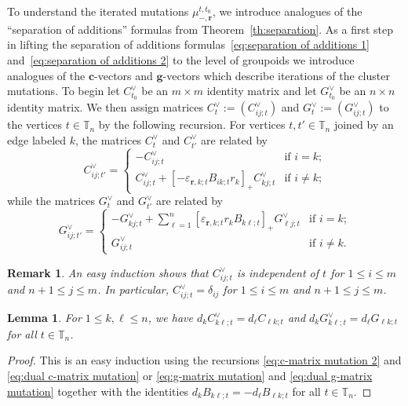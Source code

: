 \documentclass{amsart}
\newtheorem{lemma}[theorem]{Lemma}
\newtheorem{remark}[theorem]{Remark}
\numberwithin{equation}{section}
\newcommand{\bfc}{\mathbf{c}}
\newcommand{\bfg}{\mathbf{g}}
\newcommand{\bfr}{{\boldsymbol{r}}}
\newcommand{\TT}{\mathbb{T}}
\begin{document}
To understand the iterated mutations $\mu_{-,\bfr}^{t,t_0}$, we introduce analogues of the ``separation of additions'' formulas from Theorem~\ref{th:separation}.
As a first step in lifting the separation of additions formulas~\eqref{eq:separation of additions 1} and~\eqref{eq:separation of additions 2} to the level of groupoids we introduce analogues of the $\bfc$-vectors and $\bfg$-vectors which describe iterations of the cluster mutations.
To begin let $C^\vee_{t_0}$ be an $m\times m$ identity matrix and let $G^\vee_{t_0}$ be an $n\times n$ identity matrix.
We then assign matrices $C^\vee_t:=(C^\vee_{ij;t})$ and $G^\vee_t:=(G^\vee_{ij;t})$ to the vertices $t\in\TT_n$ by the following recursion.
For vertices $t,t'\in\TT_n$ joined by an edge labeled $k$, the matrices $C^\vee_t$ and $C^\vee_{t'}$ are related by
\begin{equation}
  \label{eq:dual c-matrix mutation}
  C^\vee_{ij;t'}=
  \begin{cases}
    -C^\vee_{ij;t} & \text{if $i=k$;}\\
    C^\vee_{ij;t}+[-\varepsilon_{\bfr,k;t} B_{ik;t} r_k]_+ C^\vee_{kj;t} & \text{if $i\ne k$;}
  \end{cases}
\end{equation}
while the matrices $G^\vee_t$ and $G^\vee_{t'}$ are related by
\begin{equation}
  \label{eq:dual g-matrix mutation}
  G^\vee_{ij;t'}=
  \begin{cases}
    -G^\vee_{kj;t}+\sum\limits_{\ell=1}^n [\varepsilon_{\bfr,k;t} r_k B_{k\ell;t}]_+ G^\vee_{\ell j;t} & \text{if $i=k$;}\\
    G^\vee_{ij;t} & \text{if $i\ne k$.}
  \end{cases}
\end{equation}
\begin{remark}
  An easy induction shows that $C^\vee_{ij;t}$ is independent of $t$ for $1\le i\le m$ and $n+1\le j\le m$.
  In particular, $C^\vee_{ij;t}=\delta_{ij}$ for $1\le i\le m$ and $n+1\le j\le m$.
\end{remark}
\begin{lemma}
  \label{le:dual vectors}
  For $1\le k,\ell\le n$, we have $d_kC^\vee_{k\ell;t}=d_\ell C_{\ell k;t}$ and $d_kG^\vee_{k\ell;t}=d_\ell G_{\ell k;t}$ for all $t\in\TT_n$.
\end{lemma}
\begin{proof}
  This is an easy induction using the recursions \eqref{eq:c-matrix mutation 2} and \eqref{eq:dual c-matrix mutation} or \eqref{eq:g-matrix mutation} and \eqref{eq:dual g-matrix mutation} together with the identities $d_k B_{k\ell;t}=-d_\ell B_{\ell k;t}$ for all $t\in\TT_n$.
\end{proof}
\end{document}
